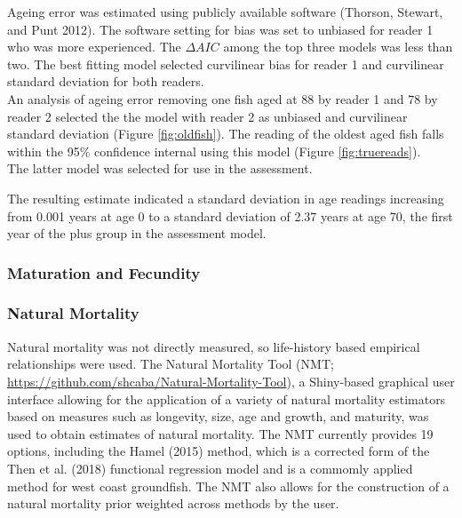 \documentclass[11pt,
  english,
  a4paper,
]{article}
\begin{document}
Ageing error was estimated using publicly available software {(Thorson, Stewart, and Punt 2012)\leavevmode\tagmcend\tagstructend}. The software setting for bias was set to unbiased for reader 1 who was more experienced. The {\(\Delta AIC\)\leavevmode\tagmcend\tagstructend} among the top three models was less than two. The best fitting model selected curvilinear bias for reader 1 and curvilinear standard deviation for both readers.\\
An analysis of ageing error removing one fish aged at 88 by reader 1 and 78 by reader 2 selected the the model with reader 2 as unbiased and curvilinear standard deviation (Figure \ref{fig:oldfish}). The reading of the oldest aged fish falls within the 95\% confidence internal using this model (Figure \ref{fig:truereads}).\\
The latter model was selected for use in the assessment.

The resulting estimate indicated a standard deviation in age readings increasing from 0.001 years at age 0 to a standard deviation of 2.37 years at age 70, the first year of the plus group in the assessment model.


\hypertarget{maturation-and-fecundity}{%
\subsubsection{Maturation and Fecundity}\label{maturation-and-fecundity}}

\leavevmode\tagmcend\tagstructend


\hypertarget{natural-mortality}{%
\subsubsection{Natural Mortality}\label{natural-mortality}}

\leavevmode\tagmcend\tagstructend

Natural mortality was not directly measured, so life-history based empirical relationships were used. The Natural Mortality Tool (NMT; {\url{https://github.com/shcaba/Natural-Mortality-Tool}\leavevmode\tagmcend\tagstructend}), a Shiny-based graphical user interface allowing for the application of a variety of natural mortality estimators based on measures such as longevity, size, age and growth, and maturity, was used to obtain estimates of natural mortality. The NMT currently provides 19 options, including the Hamel {(2015)\leavevmode\tagmcend\tagstructend} method, which is a corrected form of the Then et al. {(2018)\leavevmode\tagmcend\tagstructend} functional regression model and is a commomly applied method for west coast groundfish. The NMT also allows for the construction of a natural mortality prior weighted across methods by the user.
\end{document}
